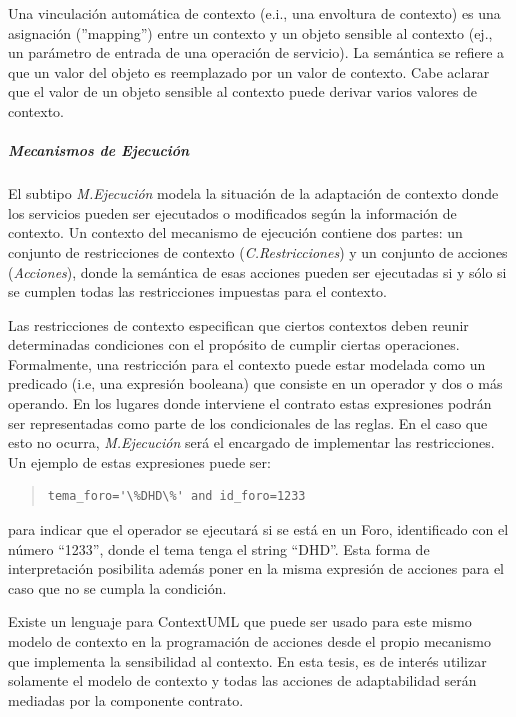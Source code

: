 Una vinculación automática de contexto (e.i., una envoltura de contexto) es
una asignación (''mapping'') entre un contexto y un objeto sensible al
contexto (ej., un parámetro de entrada de una operación de servicio). La
semántica se refiere a que un valor del objeto es reemplazado por un valor de contexto.
Cabe aclarar que el valor de un objeto sensible al contexto puede derivar varios
valores de contexto. 
 

\subparagraph{Mecanismos de Ejecución}

El subtipo \textit{M.Ejecución} modela la situación de la adaptación de
contexto
donde los servicios pueden ser ejecutados o modificados según la información
de contexto. Un contexto del mecanismo de ejecución contiene dos partes: un
conjunto de restricciones de contexto (\textit{C.Restricciones}) y un
conjunto de acciones (\textit{Acciones}), donde la semántica de esas acciones
pueden ser ejecutadas si
y sólo si se cumplen todas las restricciones impuestas para el contexto. 

Las restricciones de contexto especifican que ciertos contextos deben reunir
determinadas condiciones con el propósito de cumplir ciertas operaciones.
Formalmente, una restricción para el contexto puede estar modelada como un
predicado\cite{ContextUML} (i.e, una expresión booleana) que consiste en un
operador y dos o más operando. En los lugares donde interviene el contrato
estas expresiones podrán ser representadas como parte de los condicionales
de las reglas. En el caso que esto no ocurra, \textit{M.Ejecución} será el
encargado de implementar las restricciones. Un ejemplo de estas expresiones
puede ser: 

\begin{verse}

\begin{verbatim}
tema_foro='\%DHD\%' and id_foro=1233
\end{verbatim}               

\end{verse} 


para indicar que el operador se ejecutará si se
está en un Foro, identificado con el número “1233”, donde el tema tenga el
string “DHD”. Esta forma de interpretación posibilita además poner en
la misma expresión de acciones para el caso que no se cumpla la condición.

Existe un lenguaje para ContextUML\cite{ContextUML} que puede ser usado para
este mismo modelo de contexto en la programación de acciones desde
el propio mecanismo que implementa la sensibilidad al contexto. En esta tesis,
es de interés utilizar solamente el modelo de contexto y todas las acciones de
adaptabilidad serán mediadas por la componente contrato. 




